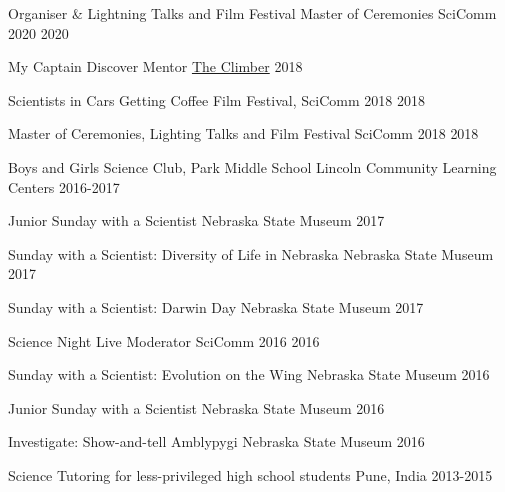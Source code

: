 

\begin{cvoutreaches}

 \cvoutreach
    {Organiser \& Lightning Talks and Film Festival Master of Ceremonies}
    {SciComm 2020}
    {2020}

 \cvoutreach
    {My Captain Discover Mentor}
    {\href{https://www.mycaptain.in/}{The Climber}}
    {2018}
    
 \cvoutreach
    {Scientists in Cars Getting Coffee}
    {Film Festival, SciComm 2018}
    {2018}
 
 \cvoutreach
    {Master of Ceremonies, Lighting Talks and Film Festival}
    {SciComm 2018}
    {2018}
     
  \cvoutreach
    {Boys and Girls Science Club, Park Middle School}
    {Lincoln Community Learning Centers}
    {2016-2017}
    
  \cvoutreach
    {Junior Sunday with a Scientist}
    {Nebraska State Museum}
    {2017}
    
   \cvoutreach
     {Sunday with a Scientist: Diversity of Life in Nebraska}
     {Nebraska State Museum}
     {2017}
     
   \cvoutreach
     {Sunday with a Scientist: Darwin Day}
     {Nebraska State Museum}
     {2017}
     
   \cvoutreach
     {Science Night Live Moderator}
     {SciComm 2016}
     {2016}
 
   \cvoutreach
     {Sunday with a Scientist: Evolution on the Wing}
     {Nebraska State Museum}
     {2016}
     
   \cvoutreach
     {Junior Sunday with a Scientist}
     {Nebraska State Museum}
     {2016}
     
   \cvoutreach
     {Investigate: Show-and-tell Amblypygi}
     {Nebraska State Museum}
     {2016}
     
  \cvoutreach
     {Science Tutoring for less-privileged high school students}
     {Pune, India}
     {2013-2015}
     
\end{cvoutreaches}

